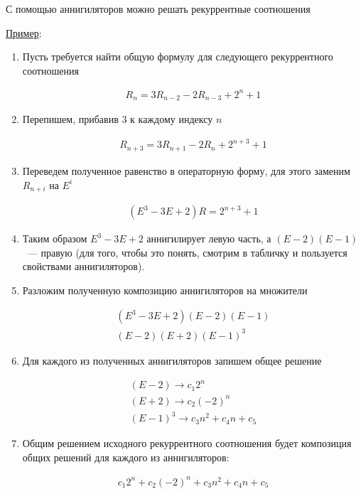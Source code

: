 С помощью аннигиляторов можно решать рекуррентные соотношения

\underline{Пример}:
\begin{enumerate}
  \item Пусть требуется найти общую формулу для следующего рекуррентного
  соотношения
  
  \begin{align*}
    R_{n} = 3 R_{n - 2} - 2R_{n - 3} + 2^{n} + 1
  \end{align*}

  \item Перепишем, прибавив \(3\) к каждому индексу \(n\)
  
  \begin{align*}
    R_{n + 3} = 3 R_{n + 1} - 2R_{n} + 2^{n + 3} + 1
  \end{align*}

  \item Переведем полученное равенство в операторную форму, для этого заменим
  \(R_{n + i}\) на \(E^{i}\)

  \begin{align*}
    (E^3 - 3E + 2) R = 2^{n + 3} + 1
  \end{align*}

  \item Таким образом \(E^3 - 3E + 2\) аннигилирует левую часть, а
  \((E - 2)(E - 1)\)~--- правую (для того, чтобы это понять, смотрим в табличку
  и пользуется свойствами аннигиляторов).

  \item Разложим полученную композицию аннигиляторов на множители
  
  \begin{align*}
    (E^3 - 3E + 2)(E - 2)(E - 1) \\
    (E - 2)(E + 2)(E - 1)^{3}
  \end{align*}

  \item Для каждого из полученных аннигиляторов запишем общее решение
  
  \begin{align*}
    (E - 2) \longrightarrow c_{1} 2^{n} \\
    (E + 2) \longrightarrow c_{2} (-2)^{n} \\
    (E - 1)^3 \longrightarrow c_{3} n^{2} + c_{4} n + c_{5}
  \end{align*}

  \item Общим решением исходного рекуррентного соотношения будет композиция
  общих решений для каждого из аннигиляторов:

  \begin{align*}
    c_{1} 2^{n} + c_{2} (-2)^{n} + c_{3} n^{2} + c_{4} n + c_{5}
  \end{align*}
\end{enumerate}